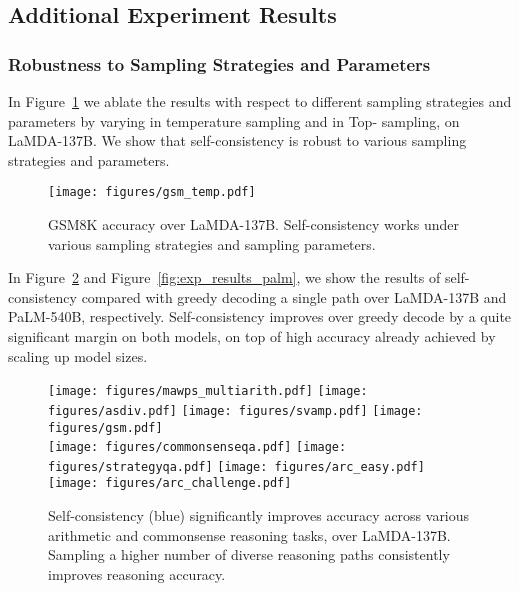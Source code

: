 \subsection{Additional Experiment Results}

\subsubsection{Robustness to Sampling Strategies and Parameters}
In Figure~\ref{fig:lamda_temp} we ablate the results with respect to different sampling strategies and parameters by varying  in temperature sampling and  in Top- sampling, on LaMDA-137B. We show that self-consistency is robust to various sampling strategies and parameters.

\begin{figure}[h]
    \centering
    \texttt{[image: figures/gsm\_temp.pdf]}
    \vspace{-0.15in}
    \caption{GSM8K accuracy over LaMDA-137B. Self-consistency works under various sampling strategies and sampling parameters.}
    \label{fig:lamda_temp}
\end{figure}

In Figure~\ref{fig:exp_results_lamda} and Figure~\ref{fig:exp_results_palm}, we show the results of self-consistency compared with greedy decoding a single path over LaMDA-137B and PaLM-540B, respectively.
Self-consistency improves over greedy decode by a quite significant margin on both models, on top of high accuracy already achieved by scaling up model sizes.

\begin{figure}[h]
\vspace{-0.1in}
\centering
\hspace{-0.15in}
\texttt{[image: figures/mawps\_multiarith.pdf]}
\hspace{-0.1in}
\texttt{[image: figures/asdiv.pdf]}
\hspace{-0.1in}
    \texttt{[image: figures/svamp.pdf]}
\hspace{-0.1in}
    \texttt{[image: figures/gsm.pdf]}\\
\hspace{-0.15in}
\texttt{[image: figures/commonsenseqa.pdf]}
\hspace{-0.1in}
    \texttt{[image: figures/strategyqa.pdf]}
    \hspace{-0.1in}
    \texttt{[image: figures/arc\_easy.pdf]}
    \hspace{-0.1in}
    \texttt{[image: figures/arc\_challenge.pdf]}\\
    \vspace{-0.1in}
    \caption{Self-consistency (blue) significantly improves accuracy across various arithmetic and commonsense reasoning tasks, over LaMDA-137B. Sampling a higher number of diverse reasoning paths consistently improves reasoning accuracy.}
    \label{fig:exp_results_lamda}
\end{figure}

